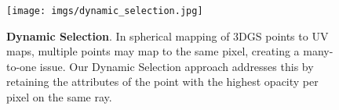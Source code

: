 \begin{figure}[t]
\centering
\texttt{[image: imgs/dynamic\_selection.jpg]} 
\vspace{-0.2cm}
\caption{
\textbf{Dynamic Selection}. In spherical mapping of 3DGS points to UV maps, multiple points may map to the same pixel, creating a many-to-one issue. Our Dynamic Selection approach addresses this by retaining the attributes of the point with the highest opacity per pixel on the same ray.
}
\label{fig:dynamic_sel}
\vspace{-0.4cm}
\end{figure}
\vspace{-0.2cm}

